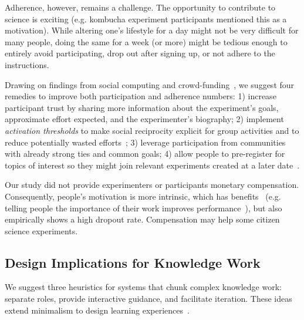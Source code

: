 Adherence, however, remains a challenge. The opportunity to contribute to science is exciting (e.g. kombucha experiment participants mentioned this as a motivation). While altering one's lifestyle for a day might not be very difficult for many people, doing the same for a week (or more) might be tedious enough to entirely avoid participating, drop out after signing up, or not adhere to the instructions.

Drawing on findings from social computing and crowd-funding~\cite{hui2014understanding, Karkar2017a}, we suggest four remedies to improve both participation and adherence numbers: 1) increase participant trust by sharing more information about the experiment's goals, approximate effort expected, and the experimenter's biography; 2) implement \textit{activation thresholds} to make social reciprocity explicit for group activities and to reduce potentially wasted efforts~\cite{cheng2014catalyst}; 3) leverage participation from communities with already strong ties and common goals; 4) allow people to pre-register for topics of interest so they might join relevant experiments created at a later date~\cite{bernstein2011crowds}.

Our study did not provide experimenters or participants monetary compensation. Consequently, people's motivation is more intrinsic, which has benefits~\cite{NationalCouncilforVoluntaryOrganisations2018} (e.g. telling people the importance of their work improves performance~\cite{Chandler2013}), but also empirically shows a high dropout rate. Compensation may help some citizen science experiments. 

\subsection{Design Implications for Knowledge Work}
We suggest three heuristics for systems that chunk complex knowledge work: separate roles, provide interactive guidance, and facilitate iteration. These ideas extend minimalism to design learning experiences~\cite{VanderMeij1995}. 

